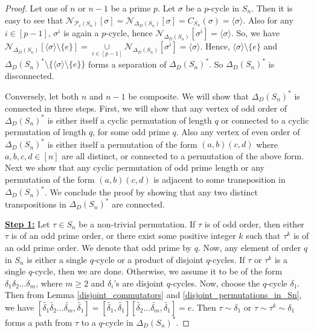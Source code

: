 \documentclass[12pt,a4paper]{article}
\begin{document}
\begin{proof}
Let one of $n$ or $n-1$ be a prime $p$. Let $\sigma$ be a $p$-cycle in $S_n$. Then it is easy to see that $\mathcal{N}_{\mathcal{P}_e(S_n)}[\sigma]=\mathcal{N}_{\Delta_D(S_n)}[\sigma]=C_{S_n}(\sigma)=\langle\sigma\rangle$. Also for any $i\in[p-1]$, $\sigma^i$ is again a $p$-cycle, hence $\mathcal{N}_{\Delta_D(S_n)}[\sigma^i]=\langle\sigma\rangle$. So, we have $\mathcal{N}_{\Delta_D(S_n)}[\langle\sigma\rangle\setminus \{e\}]=\underset{i\in[p-1]}{\cup}\mathcal{N}_{\Delta_D(S_n)}[\sigma^i]=\langle\sigma\rangle$. Hence, $\langle\sigma\rangle\setminus \{e\}$ and $\Delta_D(S_n)^*\setminus\{\langle\sigma\rangle\setminus \{e\}\}$ forms a separation of $\Delta_D(S_n)^*$. So $\Delta_D(S_n)^*$ is disconnected. 

Conversely, let both $n$ and $n-1$ be composite. We will show that $\Delta_D(S_n)^*$ is connected in three steps. First, we will show that any vertex of odd order of $\Delta_D(S_n)^*$ is either itself a cyclic permutation of length $q$ or connected to a cyclic permutation of length $q$, for some odd prime $q$. Also any vertex of even order of $\Delta_D(S_n)^*$ is either itself a permutation of the form $(a,b)(c,d)$ where $a,b,c,d\in[n]$ are all distinct, or connected to a permutation of the above form. Next we show that any cyclic permutation of odd prime length or any permutation of the form $(a,b)(c,d)$ is adjacent to some transposition in $\Delta_D(S_n)^*$. We conclude the proof by showing that any two distinct transpositions in $\Delta_D(S_n)^*$ are connected. 

\noindent\underline{\bf{Step 1:}} Let $\tau\in S_n$ be a non-trivial permutation. If $\tau$ is of odd order, then either $\tau$ is of an odd prime order, or there exist some positive integer $k$ such that $\tau^k$ is of an odd prime order. We denote that odd prime by $q$. Now, any element of order $q$ in $S_n$ is either a single $q$-cycle or a product of disjoint $q$-cycles. If $\tau$ or $\tau^k$ is a single $q$-cycle, then we are done. Otherwise, we assume it to be of the form $\delta_1\delta_2\dots\delta_m$, where $m\geq 2$ and $\delta_i$'s are disjoint $q$-cycles. Now, choose the $q$-cycle $\delta_1$. Then from Lemma \ref{disjoint_commutators} and \ref{disjoint_permutations_in_Sn}, we have  $[\tilde{\delta_1}\tilde{\delta_2}\dots\tilde{\delta_m},\tilde{\delta_1}]=[\tilde{\delta_1},\tilde{\delta_1}][\tilde{\delta_2}\dots\tilde{\delta_m},\tilde{\delta_1}]=e$. Then $\tau\sim \delta_1$ or $\tau\sim\tau^k\sim\delta_1$ forms a path from $\tau$ to a $q$-cycle in $\Delta_D(S_n)^*$.


\end{proof}
\end{document}
